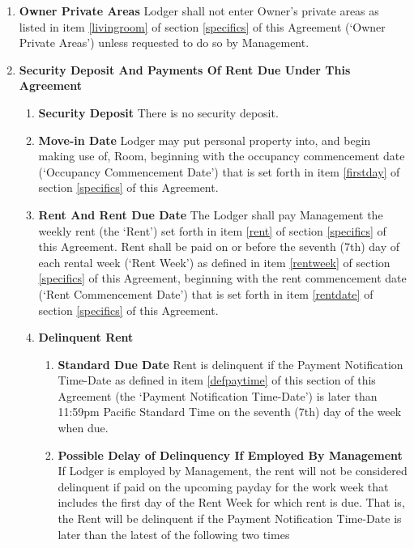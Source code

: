 \documentclass[12pt,letterpaper]{article}
\newcommand{\management}{Management}
\newcommand{\room}{Room}
\newcommand{\furniture}{Furniture, Food Prep Items, Linen, etc.}
\newcommand{\livingroom}{Owner Private Areas}
\newcommand{\firstday}{Occupancy Commencement Date}
\newcommand{\rentdate}{Rent Commencement Date}
\newcommand{\rentweek}{Rent Week}
\newcommand{\lodger}{Lodger}
\newcommand{\paymenttime}{Payment Notification Time-Date}
\begin{document}
\begin{enumerate}
\begin{enumerate}
			\item \textbf{\furniture{}} \quad \management{} shall provide the \furniture{} listed in item \ref{furniture} of section \ref{specifics} of this Agreement{} (`\furniture{}') in usable condition and maintain same in usable condition during the time \room{} is rented to \lodger{}.
		\end{enumerate}
	\item \textbf{\livingroom{}} \quad \lodger{} shall not enter Owner's private areas as listed in item \ref{livingroom} of section \ref{specifics} of this Agreement (`\livingroom{}') unless requested to do so by \management{}.
	\item \textbf{Security Deposit And Payments Of Rent Due Under This Agreement} \quad 
		\begin{enumerate}
			\item \textbf{Security Deposit} \quad There is no security deposit. 
			\item \textbf{Move-in Date} \quad \lodger{} may put personal property into, and begin making use of, \room{}, beginning with the occupancy commencement date (`\firstday{}') that is set forth in item \ref{firstday} of section \ref{specifics} of this Agreement.
			\item \textbf{Rent And Rent Due Date} \quad The \lodger{} shall pay \management{} the weekly rent (the `Rent') set forth in item \ref{rent} of section \ref{specifics} of this Agreement{}. Rent shall be paid on or before the seventh (7th) day of each rental week (`\rentweek{}') as defined in item \ref{rentweek} of section \ref{specifics} of this Agreement, beginning with the rent commencement date (`\rentdate{}') that is set forth in item \ref{rentdate} of section \ref{specifics} of this Agreement.
			\item \textbf{Delinquent Rent} \quad \label{due}
				\begin{enumerate}
					\item \textbf{Standard Due Date} \quad Rent is delinquent if the \paymenttime{} as defined in item \ref{defpaytime} of this section of this Agreement (the `\paymenttime{}') is later than 11:59pm Pacific Standard Time on the seventh (7th) day of the week when due. 
					\item \textbf{Possible Delay of Delinquency If Employed By Management} \quad If \lodger{} is employed by \management{}, the rent will not be considered delinquent if paid on the upcoming payday for the work week that includes the first day of the \rentweek{} for which rent is due. That is, the Rent will be delinquent if the \paymenttime{} is later than the latest of the following two times 

\end{enumerate}
\end{enumerate}
\end{enumerate}
\end{document}
